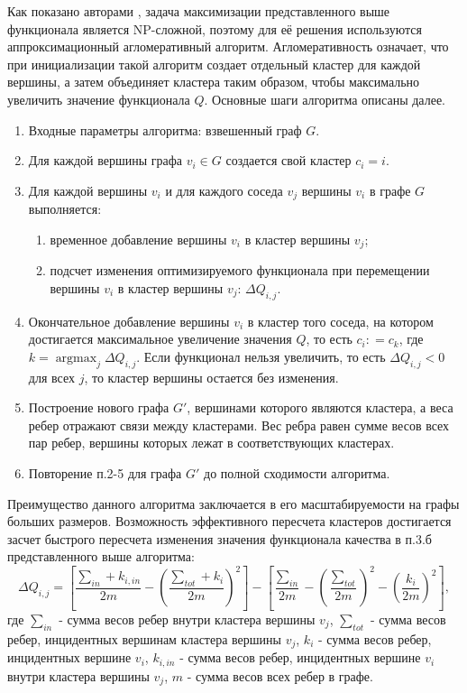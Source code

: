 Как показано авторами \cite{modularity_is_hard}, задача максимизации представленного выше функционала является NP-сложной, поэтому для её  решения используются аппроксимационный агломеративный алгоритм. Агломеративность означает, что при инициализации такой алгоритм создает отдельный кластер для каждой вершины, а затем объединяет кластера таким образом, чтобы максимально увеличить значение функционала $Q$. Основные шаги алгоритма описаны далее.

\begin{enumerate}
    \item Входные параметры алгоритма: взвешенный граф $G$.
    \item Для каждой вершины графа $v_i \in G$ создается свой кластер $c_i = i$.
    \item Для каждой вершины $v_i$ и для каждого соседа $v_j$ вершины $v_i$ в графе $G$ выполняется:
        \begin{enumerate}
            \item временное добавление вершины $v_i$ в кластер вершины $v_j$;
            \item подсчет изменения оптимизируемого функционала при перемещении вершины $v_i$ в кластер вершины $v_j$: $\Delta Q_{i,j}$.
        \end{enumerate}
    \item Окончательное добавление вершины $v_i$ в кластер того соседа, на котором достигается максимальное увеличение значения $Q$, то есть 
            $c_i \mathrel{{:}{=}} c_k$, где $k = \operatorname*{argmax}_j \Delta Q_{i, j}$.  Если функционал нельзя увеличить, то есть $\Delta Q_{i, j} < 0$ для всех $j$, то кластер вершины остается без изменения.
    \item Построение нового графа $G'$, вершинами которого являются кластера, а веса ребер отражают связи между кластерами. Вес ребра равен сумме весов всех пар ребер, вершины которых лежат в соответствующих кластерах.
    \item Повторение п.2-5 для графа $G'$ до полной сходимости алгоритма.
\end{enumerate}

Преимущество данного алгоритма заключается в его масштабируемости на графы больших размеров. Возможность эффективного пересчета кластеров достигается засчет быстрого пересчета изменения значения функционала качества в п.3.б представленного выше алгоритма:
$$ \Delta Q_{i,j} = \left[ \frac{\sum_{in} + k_{i,in}}{2m} - \left(\frac{\sum_{tot} + k_i}{2m}\right)^2 \right] - \left[ \frac{\sum_{in}}{2m} - \left(\frac{\sum_{tot}}{2m}\right)^2 - \left(\frac{k_i}{2m}\right)^2 \right], $$
где $\sum_{in}$ - сумма весов ребер внутри кластера вершины $v_j$, $\sum_{tot}$ - сумма весов ребер, инцидентных вершинам кластера вершины $v_j$, $k_i$ - сумма весов ребер, инцидентных вершине $v_i$, $k_{i, in}$ - сумма весов ребер, инцидентных вершине $v_i$ внутри кластера вершины $v_j$, $m$ - сумма весов всех ребер в графе. 

